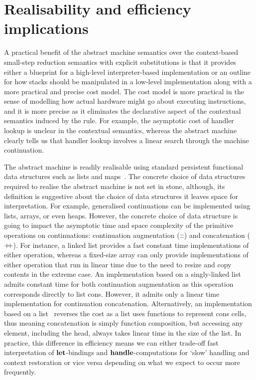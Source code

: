 \documentclass[12pt,phd,lfcs,twoside,openright,logo,leftchapter,normalheadings]{infthesis}
\theoremstyle{plain}
\theoremstyle{definition}
\begin{document}
\section{Realisability and efficiency implications}
\label{subsec:machine-realisability}

A practical benefit of the abstract machine semantics over the
context-based small-step reduction semantics with explicit
substitutions is that it provides either a blueprint for a high-level
interpreter-based implementation or an outline for how stacks should
be manipulated in a low-level implementation along with a more
practical and precise cost model. The cost model is more practical in
the sense of modelling how actual hardware might go about executing
instructions, and it is more precise as it eliminates the declarative
aspect of the contextual semantics induced by the 
rule. For example, the asymptotic cost of handler lookup is unclear in
the contextual semantics, whereas the abstract machine clearly tells
us that handler lookup involves a linear search through the machine
continuation.

The abstract machine is readily realisable using standard persistent
functional data structures such as lists and
maps~\cite{Okasaki99}. The concrete choice of data structures required
to realise the abstract machine is not set in stone, although, its
definition is suggestive about the choice of data structures it leaves
space for interpretation.
%
For example, generalised continuations can be implemented using lists,
arrays, or even heaps. However, the concrete choice of data structure
is going to impact the asymptotic time and space complexity of the
primitive operations on continuations: continuation augmentation
($::$) and concatenation ($\mathbin{+\!\!+}$).
%
For instance, a linked list provides a fast constant time
implementations of either operation, whereas a fixed-size array can
only provide implementations of either operation that run in linear
time due to the need to resize and copy contents in the extreme case.
%
An implementation based on a singly-linked list admits constant time
for both continuation augmentation as this operation corresponds
directly to list cons. However, it admits only a linear time
implementation for continuation concatenation. Alternatively, an
implementation based on a \citeauthor{Hughes86} list~\cite{Hughes86}
reverses the cost as a \citeauthor{Hughes86} list uses functions to
represent cons cells, thus meaning concatenation is simply function
composition, but accessing any element, including the head, always
takes linear time in the size of the list. In practice, this
difference in efficiency means we can either trade-off fast
interpretation of $\mathbf{let}$-bindings and $\mathbf{handle}$-computations for
`slow' handling and context restoration or vice versa depending on
what we expect to occur more frequently.
\end{document}
